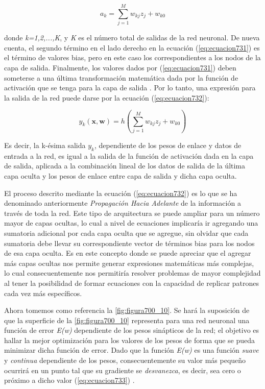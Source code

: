 {\begin{equation}
	a_k=\sum_{j=1}^{M} {w_{kj} z_j + w_{k0}}
	\label{eq:ecuacion731}
\end{equation}

donde \textit{k=1,2,...,K}, y \textit{K} es el número total de salidas de la red neuronal. De nueva cuenta, el segundo término en el lado derecho en la ecuación (\ref{eq:ecuacion731}) es el término de valores bias, pero en este 
caso los correspondientes a los nodos de la capa de salida. Finalmente, los valores dados por (\ref{eq:ecuacion731}) deben someterse a una última transformación matemática dada por la función de activación que se tenga para 
la capa de salida \cite{bishop}. Por lo tanto, una expresión para la salida de la red puede darse por la ecuación (\ref{eq:ecuacion732}):

\begin{equation}
	y_k(\textbf{x}, \textbf{w})=h( \sum_{j=1}^{M} {w_{kj} z_j + w_{k0}} )
	\label{eq:ecuacion732}
\end{equation}

Es decir, la k-ésima salida \textit{$y_k$}, dependiente de los pesos de enlace y datos de entrada a la red, es igual a la salida de la función de activación dada en la capa de salida, aplicada a la combinación 
lineal de los datos de salida de la última capa oculta y los pesos de enlace entre capa de salida y dicha capa oculta.

El proceso descrito mediante la ecuación (\ref{eq:ecuacion732}) es lo que se ha denominado anteriormente \textit{Propagación Hacia Adelante} de la información a través de toda la red. Este tipo de arquitectura se puede ampliar 
para un número mayor de capas ocultas, lo cual a nivel de ecuaciones implicaría ir agregando una sumatoria adicional por cada capa oculta que se agregue, sin olvidar que cada sumatoria debe llevar su correspondiente vector de términos bias para los nodos de esa capa oculta. Es en este concepto donde se puede apreciar que el agregar más capas 
ocultas nos permite generar expresiones matemáticas más complejas, lo cual consecuentemente nos permitiría resolver problemas de mayor complejidad al tener la posibilidad de formar ecuaciones con la capacidad de replicar 
patrones cada vez más específicos.

Ahora tomemos como referencia la \autoref{fig:figura700_10}. Se hará la suposición de que la superficie de la \autoref{fig:figura700_10} representa para una red neuronal una función de error \textit{E(w)} dependiente de los pesos sinápticos de la red; el objetivo es hallar la mejor optimización 
para los valores de los pesos de forma que se pueda minimizar dicha función de error. Dado que la función \textit{E(w)} es una función \textit{suave} y \textit{continua} dependiente de los pesos, consecuentemente su valor 
más pequeño ocurrirá en un punto tal que su gradiente se \textit{desvanezca}, es decir, sea cero o próximo a dicho valor (\ref{eq:ecuacion733}) \cite{bishop}.

}
